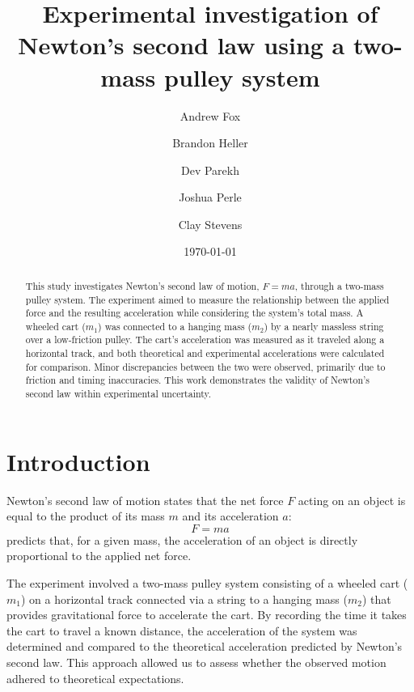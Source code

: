 \documentclass[reprint,amsmath,amssymb,aps]{revtex4-2}
\begin{document}
\title{Experimental investigation of Newton's second law using a two-mass pulley system}
\author{Andrew Fox}
\author{Brandon Heller}
\author{Dev Parekh}
\author{Joshua Perle}
\author{Clay Stevens}
\date{\today}

\begin{abstract}
This study investigates Newton’s second law of motion, $F = ma$, through a two-mass pulley system. The experiment aimed to measure the relationship between the applied force and the resulting acceleration while considering the system's total mass. A wheeled cart ($m_1$) was connected to a hanging mass ($m_2$) by a nearly massless string over a low-friction pulley. The cart’s acceleration was measured as it traveled along a horizontal track, and both theoretical and experimental accelerations were calculated for comparison. Minor discrepancies between the two were observed, primarily due to friction and timing inaccuracies. This work demonstrates the validity of Newton’s second law within experimental uncertainty.
\end{abstract}


\maketitle






\section{Introduction}
Newton’s second law of motion states that the net force $F$ acting on an object is equal to the product of its mass $m$ and its acceleration $a$:
\begin{equation}
F = ma
\label{eq:1}
\end{equation}
 predicts that, for a given mass, the acceleration of an object is directly proportional to the applied net force. 

The experiment involved a two-mass pulley system consisting of a wheeled cart ($m_1$) on a horizontal track connected via a string to a hanging mass ($m_2$) that provides gravitational force to accelerate the cart. By recording the time it takes the cart to travel a known distance, the acceleration of the system was determined and compared to the theoretical acceleration predicted by Newton's second law. This approach allowed us to assess whether the observed motion adhered to theoretical expectations.
\end{document}
